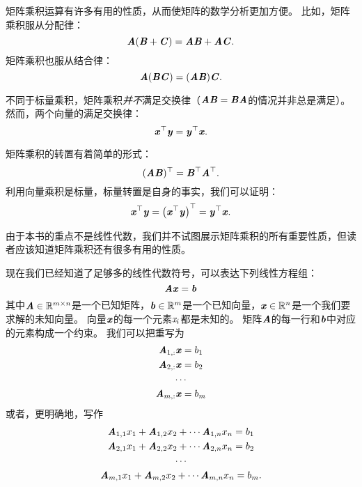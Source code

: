 矩阵乘积运算有许多有用的性质，从而使矩阵的数学分析更加方便。
比如，矩阵乘积服从分配律：
\begin{equation}
    \MA(\MB+\MC)=\MA\MB +\MA\MC.
\end{equation}
矩阵乘积也服从结合律：
\begin{equation}
\MA(\MB\MC)=(\MA\MB)\MC.
\end{equation}




不同于标量乘积，矩阵乘积\emph{并不}满足交换律（$\MA\MB=\MB\MA$的情况并非总是满足）。
然而，两个向量的满足交换律：
\begin{equation}
\Vx^\top\Vy=\Vy^\top\Vx.
\label{eq:2.8}
\end{equation}


矩阵乘积的转置有着简单的形式：
\begin{equation}
(\MA\MB)^\top=\MB^\top\MA^\top.
\end{equation}
利用向量乘积是标量，标量转置是自身的事实，我们可以证明：
\begin{equation}
    \Vx^\top \Vy = \left(\Vx^\top \Vy \right)^\top = \Vy^\top \Vx.
\end{equation}


由于本书的重点不是线性代数，我们并不试图展示矩阵乘积的所有重要性质，但读者应该知道矩阵乘积还有很多有用的性质。


现在我们已经知道了足够多的线性代数符号，可以表达下列线性方程组：
\begin{equation}
\MA\Vx=\Vb
\label{eq:2.11}
\end{equation}
其中$\MA\in \SetR^{m\times n}$是一个已知矩阵，$\Vb\in\SetR^m$是一个已知向量，$\Vx\in\SetR^n$是一个我们要求解的未知向量。
向量$\Vx$的每一个元素$\Sx_i$都是未知的。
矩阵$\MA$的每一行和$\Vb$中对应的元素构成一个约束。
我们可以把重写为
\begin{gather}
\MA_{1,:}\Vx=b_1\\
\MA_{2,:}\Vx=b_2 \\
\cdots \\
\MA_{m,:}\Vx=b_m
\end{gather}
或者，更明确地，写作
\begin{gather}
    \MA_{1,1}x_1+\MA_{1,2}x_2+\cdots \MA_{1,n}x_n = b_1\\
    \MA_{2,1}x_1+\MA_{2,2}x_2+\cdots \MA_{2,n}x_n = b_2\\
    \cdots\\
    \MA_{m,1}x_1+\MA_{m,2}x_2+\cdots \MA_{m,n}x_n = b_m.
\end{gather}


